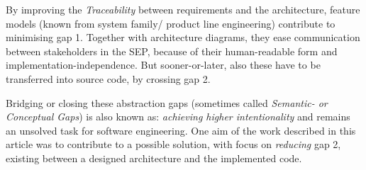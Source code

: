 By improving the \emph{Traceability} between requirements and the architecture,
feature models (known from system family/ product line engineering) contribute
to minimising gap 1. Together with architecture diagrams, they ease
communication between stakeholders in the SEP, because of their human-readable
form and implementation-independence. But sooner-or-later, also these have to
be transferred into source code, by crossing gap 2.

Bridging or closing these abstraction gaps (sometimes called \emph{Semantic- or
Conceptual Gaps}) is also known as: \textit{achieving higher intentionality}
and remains an unsolved task for software engineering. One aim of the work
described in this article was to contribute to a possible solution, with focus
on \emph{reducing} gap 2, existing between a designed architecture and the
implemented code.
